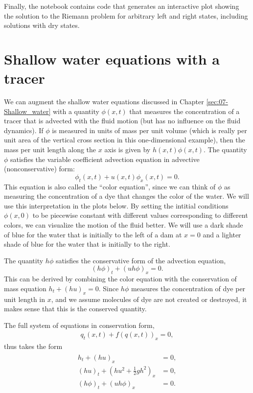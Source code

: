 \documentclass{SIAMbook2016}
\begin{document}
Finally, the notebook contains code that generates an interactive plot
showing the solution to the Riemann problem for arbitrary left and right
states, including solutions with dry states.

\hypertarget{shallow-water-equations-with-a-tracer}{%
\chapter{Shallow water equations with a
tracer}\label{shallow-water-equations-with-a-tracer}}
\label{sec:08-Shallow_tracer}
We can augment the shallow water equations discussed in
Chapter \ref{sec:07-Shallow_water} with a quantity \(\phi(x,t)\) that
measures the concentration of a tracer that is advected with the fluid
motion (but has no influence on the fluid dynamics). If \(\phi\) is
measured in units of mass per unit volume (which is really per unit area
of the vertical cross section in this one-dimensional example), then the
mass per unit length along the \(x\) axis is given by
\(h(x,t)\phi(x,t)\). The quantity \(\phi\) satisfies the variable
coefficient advection equation in advective (nonconservative) form: \[
\phi_t(x,t) + u(x,t)\phi_x(x,t) = 0.
\] This equation is also called the ``color equation'', since we can
think of \(\phi\) as measuring the concentration of a dye that changes
the color of the water. We will use this interpretation in the plots
below. By setting the intitial conditions \(\phi(x,0)\) to be piecewise
constant with different values corresponding to different colors, we can
visualize the motion of the fluid better. We will use a dark shade of
blue for the water that is initially to the left of a dam at \(x=0\) and
a lighter shade of blue for the water that is initially to the right.

The quantity \(h\phi\) satisfies the conservative form of the advection
equation, \[
(h\phi)_t + (uh\phi)_x = 0.
\] This can be derived by combining the color equation with the
conservation of mass equation \(h_t +(hu)_x = 0\). Since \(h\phi\)
measures the concentration of dye per unit length in \(x\), and we
assume molecules of dye are not created or destroyed, it makes sense
that this is the conserved quantity.

The full system of equations in conservation form,
\begin{align} \label{SW-tracer}
q_t(x,t) + f(q(x,t))_x = 0,
\end{align} thus takes the form \begin{align*}
\begin{split}
h_t + (hu)_x &=0,\\
(hu)_t + \left(hu^2 + \frac 1 2 gh^2\right)_x &=0,\\
(h\phi)_t + (uh\phi)_x &= 0.
\end{split}
\end{align*}
\end{document}

